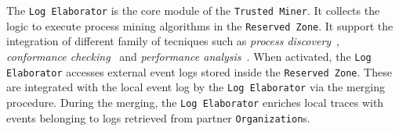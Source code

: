 The \texttt{Log Elaborator} is the core module of the \texttt{Trusted Miner}. It collects the logic to execute process mining algorithms in the \texttt{Reserved Zone}. It support the integration of different family of tecniques such as \textit{process discovery}~\cite{citation}, \textit{conformance checking}~\cite{citation} and \textit{performance analysis}~\cite{ciation}. When activated, the \texttt{Log Elaborator} %
accesses external event logs stored inside the \texttt{Reserved Zone}. These are integrated with the local event log by the \texttt{Log Elaborator} via the merging procedure. During the merging, the \texttt{Log Elaborator} enriches local traces with events belonging to logs retrieved from partner \texttt{Organization}s.

